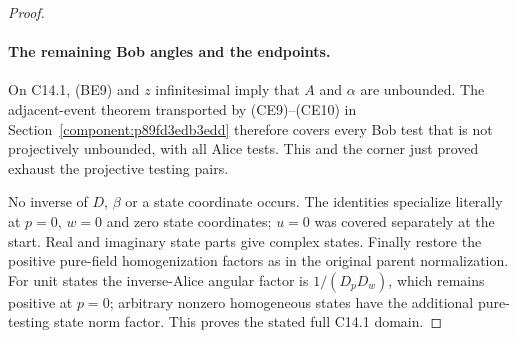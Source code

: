 \begin{proof}
\paragraph{The remaining Bob angles and the endpoints.}
On C14.1, (BE9) and $z$ infinitesimal imply that $A$ and $\alpha$
are unbounded. The adjacent-event theorem transported by
(CE9)--(CE10) in Section~\ref{component:p89fd3edb3edd} therefore
covers every Bob test that is not projectively unbounded, with all
Alice tests. This and the corner just proved exhaust the projective
testing pairs.

No inverse of $D$, $\beta$ or a state coordinate occurs. The
identities specialize literally at $p=0$, $w=0$ and zero state
coordinates; $u=0$ was covered separately at the start. Real and
imaginary state parts give complex states. Finally restore the
positive pure-field homogenization factors as in the original
parent normalization. For unit states the inverse-Alice angular
factor is $1/(D_pD_w)$, which remains positive at $p=0$; arbitrary
nonzero homogeneous states have the additional pure-testing state
norm factor. This proves the stated full C14.1 domain.
\end{proof}
